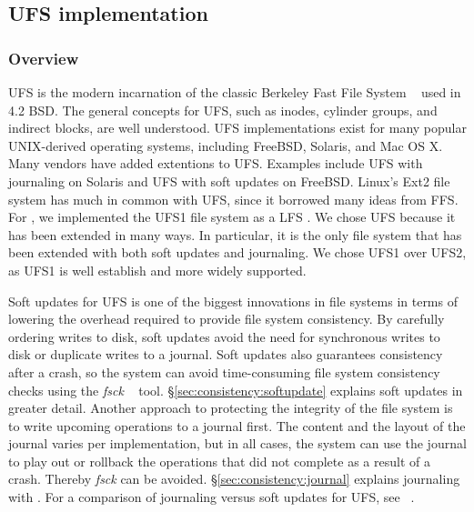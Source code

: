\subsection{UFS implementation}
\label{sec:modules:ufs}

\subsubsection {Overview}
UFS is the modern incarnation of the classic Berkeley Fast File System
~\cite{mckusick84fast} used in 4.2 BSD. The general concepts for UFS, such as
inodes, cylinder groups, and indirect blocks, are well understood. UFS
implementations exist for many popular UNIX-derived operating systems, including
FreeBSD, Solaris, and Mac OS X. Many vendors have added extentions to UFS.
Examples include UFS with journaling on Solaris and UFS with soft updates on
FreeBSD. Linux's Ext2 file system has much in common with UFS, since it borrowed
many ideas from FFS. For \Kudos, we implemented the UFS1 file system as a LFS
\module. We chose UFS because it has been extended in many ways. In particular,
it is the only file system that has been extended with both soft updates and
journaling. We chose UFS1 over UFS2, as UFS1 is well establish and more widely
supported.

Soft updates for UFS is one of the biggest innovations in file systems in terms
of lowering the overhead required to provide file system consistency. By
carefully ordering writes to disk, soft updates avoid the need for synchronous
writes to disk or duplicate writes to a journal. Soft updates also guarantees
consistency after a crash, so the system can avoid time-consuming file system
consistency checks using the \emph{fsck} ~\cite{mckusick94fsck} tool.
\S\ref{sec:consistency:softupdate} explains soft updates in greater detail.
Another approach to protecting the integrity of the file system is to write
upcoming operations to a journal first. The content and the layout of the
journal varies per implementation, but in all cases, the system can use the
journal to play out or rollback the operations that did not complete as a result
of a crash. Thereby \emph{fsck} can be avoided. \S\ref{sec:consistency:journal}
explains journaling with \chdescs. For a comparison of journaling versus soft
updates for UFS, see ~\cite{seltzer00journaling}.

